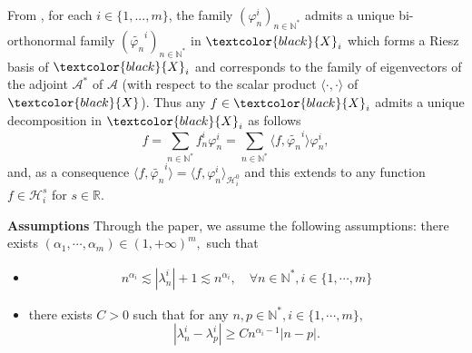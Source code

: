\documentclass[11pt, dvipsnames]{amsart}
\begin{document}
 From \cite{beauchard2010local}, for each $i\in\{1,...,m\}$, the family $(\varphi_n^{i})_{n\in \mathbb{N^*}}$ admits a unique bi-orthonormal family $(\widetilde{\varphi_n}^{i})_{n\in \mathbb{N^*}}$ in $\textcolor{black}{X}_{i}$ which forms a Riesz basis of $\textcolor{black}{X}_{i}$ and corresponds to the family of eigenvectors of the adjoint $\mathcal{A}^*$ of $\mathcal{A}$ (with respect to the scalar product $\langle \cdot,\cdot \rangle$ of $\textcolor{black}{X}$). Thus any $f\in \textcolor{black}{X}_{i}$ admits a unique decomposition in $\textcolor{black}{X}_{i}$ as follows
\begin{equation*}
    f=\sum_{n\in \mathbb{N^*}}f_n^i\varphi_n^{i}=\sum_{n\in \mathbb{N^*}}\langle f,\widetilde{\varphi_n}^{i}\rangle \varphi_n^{i},
\end{equation*}
and, as a consequence $\langle f,\widetilde{\varphi_n}^{i}\rangle = \langle f,\varphi_n^{i}\rangle_{\mathcal{H}^{0}_{i}}$ and this extends to any function $f\in \mathcal{H}_{i}^{s}$ for $s\in \mathbb{R}$. 

\noindent \textbf{Assumptions}\;\; Through the paper, we assume the following assumptions:
there exists $(\alpha_1,\cdots,\alpha_m)\in (1,+\infty)^m,$ such that
\begin{itemize}
    \item 
    \begin{align}
n^{\alpha_i}\lesssim|\lambda_n^i|+1\lesssim 
        n^{\alpha_i},\quad \forall n\in \mathbb{N}^*, i\in\{1,\cdots,m\} \label{ln+1_cond}
    \end{align}
    \item there exists $C>0$ 
    such that for any $n,p\in \mathbb{N}^*, i\in\{1,\cdots,m\},$
    \begin{equation}\label{ln-lp_cond}
        |\lambda_n^i-\lambda_p^i|\geq C n^{\alpha_i-1}|n-p|.%
    \end{equation}
    
\end{itemize}
\end{document}
